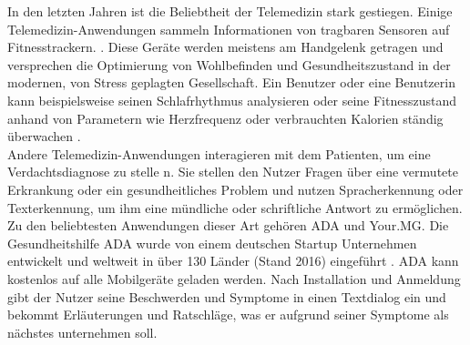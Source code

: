 In den letzten Jahren ist die Beliebtheit der Telemedizin stark gestiegen. Einige Telemedizin-Anwendungen sammeln Informationen von tragbaren Sensoren auf Fitnesstrackern. \cite{Opportunities_challenges_ai_hc}. Diese Geräte werden meistens am Handgelenk getragen und versprechen die Optimierung von Wohlbefinden und Gesundheitszustand in der modernen, von Stress geplagten Gesellschaft. Ein Benutzer oder eine Benutzerin kann beispielsweise seinen Schlafrhythmus analysieren oder seine Fitnesszustand anhand von Parametern wie Herzfrequenz oder verbrauchten Kalorien ständig überwachen \cite{Opportunities_challenges_ai_hc}. \\

Andere Telemedizin-Anwendungen interagieren mit dem Patienten, um eine Verdachtsdiagnose zu stelle n\cite{Opportunities_challenges_ai_hc}. Sie stellen den Nutzer Fragen über eine vermutete Erkrankung oder ein gesundheitliches Problem und nutzen Spracherkennung oder Texterkennung, um ihm eine mündliche oder schriftliche Antwort zu ermöglichen.
Zu den beliebtesten Anwendungen dieser Art gehören ADA und Your.MG. Die Gesundheitshilfe ADA wurde von einem deutschen Startup Unternehmen entwickelt und weltweit in über 130 Länder (Stand 2016) eingeführt \cite{Opportunities_challenges_ai_hc}. ADA kann kostenlos auf alle Mobilgeräte geladen werden. Nach Installation und Anmeldung gibt der Nutzer seine Beschwerden und Symptome in einen Textdialog ein und bekommt Erläuterungen und Ratschläge, was er aufgrund seiner Symptome als nächstes unternehmen soll.\\
 
